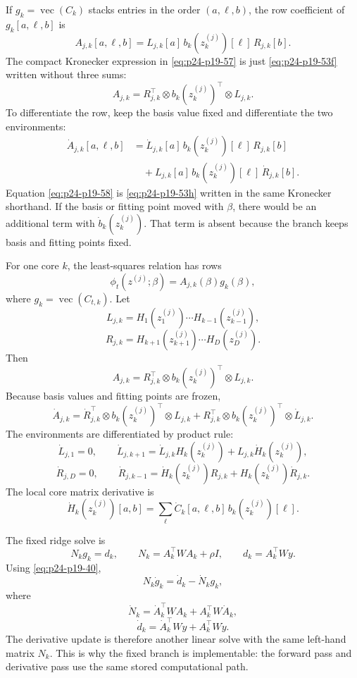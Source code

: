 \documentclass[11pt]{article}
\newcommand{\vecop}{\operatorname{vec}}
\begin{document}
If \(g_k=\vecop(C_k)\) stacks entries in the order \((a,\ell,b)\), the row
coefficient of \(g_k[a,\ell,b]\) is
\[
    A_{j,k}[a,\ell,b]
    =
    L_{j,k}[a]\,
    b_k(z_k^{(j)})[\ell]\,
    R_{j,k}[b].
    \label{eq:p24-p19-53f}
\]
The compact Kronecker expression in \eqref{eq:p24-p19-57} is just \eqref{eq:p24-p19-53f} written without three
sums:
\[
    A_{j,k}
    =
    R_{j,k}^{\top}\otimes b_k(z_k^{(j)})^\top\otimes L_{j,k}.
    \label{eq:p24-p19-53g}
\]
To differentiate the row, keep the basis value fixed and differentiate the
two environments:
\[
\begin{aligned}
    \dot A_{j,k}[a,\ell,b]
    &=
    \dot L_{j,k}[a]\,
    b_k(z_k^{(j)})[\ell]\,
    R_{j,k}[b]\\
    &\quad+
    L_{j,k}[a]\,
    b_k(z_k^{(j)})[\ell]\,
    \dot R_{j,k}[b].
\end{aligned}
    \label{eq:p24-p19-53h}
\]
Equation \eqref{eq:p24-p19-58} is \eqref{eq:p24-p19-53h} written in the same Kronecker shorthand.  If the basis
or fitting point moved with \(\beta\), there would be an additional term with
\(\dot b_k(z_k^{(j)})\).  That term is absent because the branch keeps basis
and fitting points fixed.

For one core \(k\), the least-squares relation has rows
\[
    \phi_t(z^{(j)};\beta)=A_{j,k}(\beta)g_k(\beta),
    \label{eq:p24-p19-54}
\]
where \(g_k=\vecop(C_{t,k})\).  Let
\[
    L_{j,k}
    =
    H_{1}(z_1^{(j)})\cdots H_{k-1}(z_{k-1}^{(j)}),
    \label{eq:p24-p19-55}
\]
\[
    R_{j,k}
    =
    H_{k+1}(z_{k+1}^{(j)})\cdots H_D(z_D^{(j)}).
    \label{eq:p24-p19-56}
\]
Then
\[
    A_{j,k}
    =
    R_{j,k}^{\top}\otimes b_k(z_k^{(j)})^\top\otimes L_{j,k}.
    \label{eq:p24-p19-57}
\]
Because basis values and fitting points are frozen,
\[
    \dot A_{j,k}
    =
    \dot R_{j,k}^{\top}\otimes b_k(z_k^{(j)})^\top\otimes L_{j,k}
    +
    R_{j,k}^{\top}\otimes b_k(z_k^{(j)})^\top\otimes \dot L_{j,k}.
    \label{eq:p24-p19-58}
\]
The environments are differentiated by product rule:
\[
    \dot L_{j,1}=0,
    \qquad
    \dot L_{j,k+1}
    =
    \dot L_{j,k}H_k(z_k^{(j)})
    +
    L_{j,k}\dot H_k(z_k^{(j)}),
    \label{eq:p24-p19-59}
\]
\[
    \dot R_{j,D}=0,
    \qquad
    \dot R_{j,k-1}
    =
    \dot H_k(z_k^{(j)})R_{j,k}
    +
    H_k(z_k^{(j)})\dot R_{j,k}.
    \label{eq:p24-p19-60}
\]
The local core matrix derivative is
\[
    \dot H_k(z_k^{(j)})[a,b]
    =
    \sum_{\ell}
    \dot C_k[a,\ell,b]\,b_k(z_k^{(j)})[\ell].
    \label{eq:p24-p19-61}
\]

The fixed ridge solve is
\[
    N_k g_k=d_k,
    \qquad
    N_k=A_k^\top W A_k+\rho I,
    \qquad
    d_k=A_k^\top W y.
    \label{eq:p24-p19-62}
\]
Using \eqref{eq:p24-p19-40},
\[
    N_k\dot g_k=\dot d_k-\dot N_k g_k,
    \label{eq:p24-p19-63}
\]
where
\[
    \dot N_k=\dot A_k^\top W A_k+A_k^\top W\dot A_k,
    \label{eq:p24-p19-64}
\]
\[
    \dot d_k=\dot A_k^\top W y+A_k^\top W\dot y.
    \label{eq:p24-p19-65}
\]
The derivative update is therefore another linear solve with the same
left-hand matrix \(N_k\).  This is why the fixed branch is implementable: the
forward pass and derivative pass use the same stored computational path.
\end{document}
